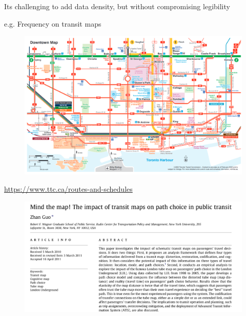 \documentclass[aspectratio=169]{beamer}
\begin{document}
\begin{frame}
	
	Its challenging to add data density, but without compromising legibility
	
	\vspace{2mm}
		e.g. Frequency on transit maps
	\begin{figure}
		\centering
		\includegraphics[width=0.84\linewidth]{images/ttc_downtown.png}
	\end{figure}
	
	\tiny \url{https://www.ttc.ca/routes-and-schedules}
	
\end{frame}




\begin{frame}
	
	\begin{figure}
		\centering
		\includegraphics[width=0.88\linewidth]{images/mind-the-map.png}
	\end{figure}
	
\end{frame}
\end{document}
